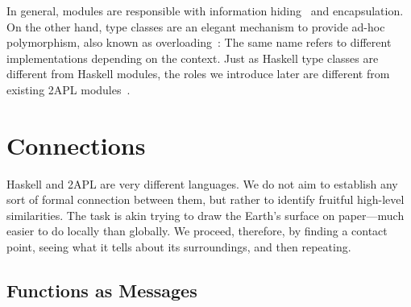 \documentclass[conference,compsoc]{IEEEtran} %
\begin{document}
In general, modules are responsible with information
hiding~\cite{DBLP:journals/cacm/Parnas72a} and encapsulation.  On the other
hand, type classes are an elegant mechanism to provide ad-hoc polymorphism,
also known as overloading~\cite{DBLP:conf/popl/WadlerB89}: The same name
refers to different implementations depending on the context.  Just as
Haskell type classes are different from Haskell modules, the roles we
introduce later are different from existing 2APL
modules~\cite{dblp:conf/prima/dastanims08}.

\section{Connections} %

Haskell and 2APL are very different languages. We do not aim to establish
any sort of formal connection between them, but rather to identify fruitful
high-level similarities. The task is akin trying to draw the Earth's
surface on paper---much easier to do locally than globally. We proceed,
therefore, by finding a contact point, seeing what it tells about its
surroundings, and then repeating.

\subsection{Functions as Messages} %
\end{document}
